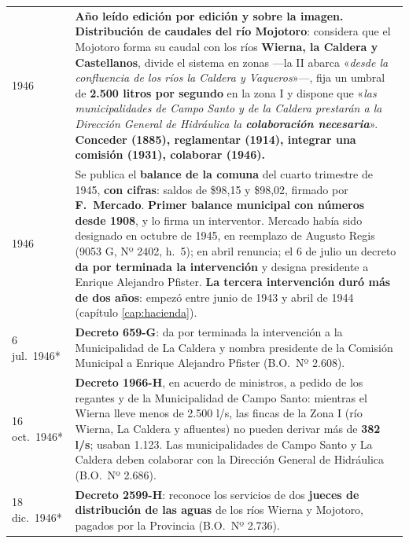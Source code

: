 \begin{longtable}{@{}p{2.7cm}p{10.3cm}@{}}
1946 & \textbf{Año leído edición por edición y sobre la imagen.} \textbf{Distribución de caudales del río Mojotoro}: considera que el Mojotoro forma su caudal con los ríos \textbf{Wierna, la Caldera y Castellanos}, divide el sistema en zonas ---la II abarca «\textit{desde la confluencia de los ríos la Caldera y Vaqueros}»---, fija un umbral de \textbf{2.500 litros por segundo} en la zona I y dispone que «\textit{las municipalidades de Campo Santo y de la Caldera prestarán a la Dirección General de Hidráulica la \textbf{colaboración necesaria}}». \textbf{Conceder (1885), reglamentar (1914), integrar una comisión (1931), colaborar (1946).} \\
1946 & Se publica el \textbf{balance de la comuna} del cuarto trimestre de 1945, \textbf{con cifras}: saldos de \$98,15 y \$98,02, firmado por \textbf{F.\ Mercado}. \textbf{Primer balance municipal con números desde 1908}, y lo firma un interventor. Mercado había sido designado en octubre de 1945, en reemplazo de Augusto Regis (9053 G, Nº 2402, h.\ 5); en abril renuncia; el 6 de julio un decreto \textbf{da por terminada la intervención} y designa presidente a Enrique Alejandro Pfister. \textbf{La tercera intervención duró más de dos años}: empezó entre junio de 1943 y abril de 1944 (capítulo \ref{cap:hacienda}). \\
6 jul.\ 1946* & \textbf{Decreto 659-G}: da por terminada la intervención a la Municipalidad de La Caldera y nombra presidente de la Comisión Municipal a Enrique Alejandro Pfister (B.O.\ Nº 2.608). \\
16 oct.\ 1946* & \textbf{Decreto 1966-H}, en acuerdo de ministros, a pedido de los regantes y de la Municipalidad de Campo Santo: mientras el Wierna lleve menos de 2.500 l/s, las fincas de la Zona I (río Wierna, La Caldera y afluentes) no pueden derivar más de \textbf{382 l/s}; usaban 1.123. Las municipalidades de Campo Santo y La Caldera deben colaborar con la Dirección General de Hidráulica (B.O.\ Nº 2.686). \\
18 dic.\ 1946* & \textbf{Decreto 2599-H}: reconoce los servicios de dos \textbf{jueces de distribución de las aguas} de los ríos Wierna y Mojotoro, pagados por la Provincia (B.O.\ Nº 2.736). \\

\end{longtable}

